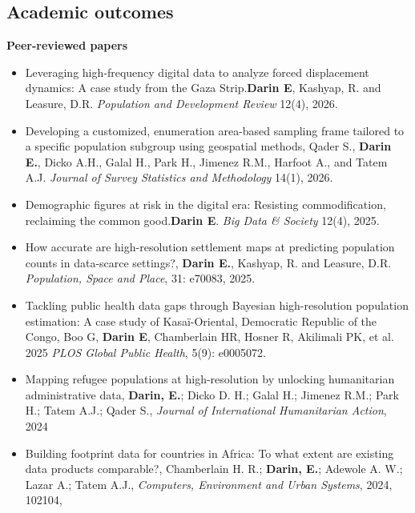 \documentclass[
]{friggeri-cv}
\begin{document}
\begin{noside}

\section{Academic outcomes}
\textbf{Peer-reviewed papers}
\begin{itemize}
\item Leveraging high‐frequency digital data to analyze forced displacement dynamics: A case study from the Gaza Strip.\textbf{Darin E}, Kashyap, R. and Leasure, D.R. \textit{Population and Development Review} 12(4), 2026.\href{https://doi.org/10.1111/padr.70064}{\scriptsize{}}
\item Developing a customized, enumeration area-based sampling frame tailored to a specific population subgroup using geospatial methods, Qader S., \textbf{Darin E.}, Dicko A.H., Galal H., Park H., Jimenez R.M., Harfoot A., and Tatem A.J. \textit{Journal of Survey Statistics and Methodology} 14(1), 2026. \href{https://doi.org/10.1093/jssam/smaf027}{\scriptsize{}}
\item Demographic figures at risk in the digital era: Resisting commodification, reclaiming the common good.\textbf{Darin E}. \textit{Big Data \& Society} 12(4), 2025.\href{https://doi.org/10.1177/20539517251403948}{\scriptsize{}}
\item  How accurate are high-resolution settlement maps at predicting population counts in data-scarce settings?, \textbf{Darin E.}, Kashyap, R. and Leasure, D.R.  \textit{Population, Space and Place}, 31: e70083, 2025. \href{https://doi.org/10.1002/psp.70083}{\scriptsize{}}
\item Tackling public health data gaps through Bayesian high-resolution population estimation: A case study of Kasaï-Oriental, Democratic Republic of the Congo, Boo G, \textbf{Darin E}, Chamberlain HR, Hosner R, Akilimali PK, et al. 2025 \textit{PLOS Global Public Health}, 5(9): e0005072. \href{https://doi.org/10.1371/journal.pgph.0005072}{\scriptsize{}}
\item Mapping refugee populations at high-resolution by unlocking humanitarian administrative data, \textbf{Darin, E.}; Dicko D. H.;  Galal H.; Jimenez R.M.; Park H.;  Tatem A.J.; Qader S., \textit{Journal of International Humanitarian Action}, 2024 \href{https://doi.org/10.1186/s41018-024-00157-6}{\scriptsize{}}
\item Building footprint data for countries in Africa: To what extent are existing data products comparable?, Chamberlain H. R.; \textbf{Darin, E.}; Adewole A. W.; Lazar A.; Tatem A.J., \textit{Computers, Environment and Urban Systems}, 2024, 102104, \href{https://doi.org/10.1016/j.compenvurbsys.2024.102104}{\scriptsize{}}

\end{itemize}
\end{noside}
\end{document}
